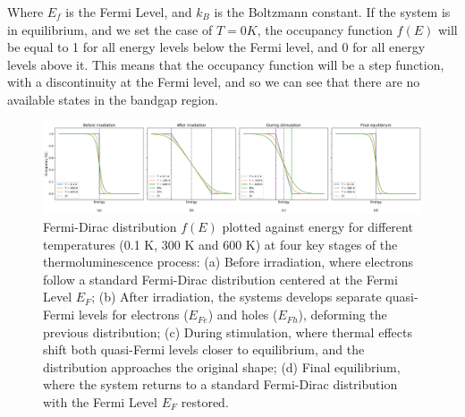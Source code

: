 \vspace{10pt}
Where $E_f$ is the Fermi Level, and $k_B$ is the Boltzmann constant. If the system is in equilibrium, and we set the case of $T=0K$, the occupancy function $f(E)$ will be equal to 1 for all energy levels below the Fermi level, and 0 for all energy levels above it. This means that the occupancy function will be a step function, with a discontinuity at the Fermi level, and so we can see that there are no available states in the bandgap region.

\begin{figure}
  \centering
  \includegraphics[width=\textwidth]{Images/FD_irradiation.png}
  \caption[Fermi-Dirac distributions at different temperatures and TL process stages.]{Fermi-Dirac distribution $f(E)$ plotted against energy for different temperatures (0.1 K, 300 K and 600 K) at four key stages of the thermoluminescence process: (a) Before irradiation, where electrons follow a standard Fermi-Dirac distribution centered at the Fermi Level $E_F$; (b) After irradiation, the systems develops separate quasi-Fermi levels for electrons ($E_{Fe}$) and holes ($E_{Fh}$), deforming the previous distribution; (c) During stimulation, where thermal effects shift both quasi-Fermi levels closer to equilibrium, and the distribution approaches the original shape; (d) Final equilibrium, where the system returns to a standard Fermi-Dirac distribution with the Fermi Level $E_F$ restored. }
  \label{fig:FD_irradiation}
\end{figure}

